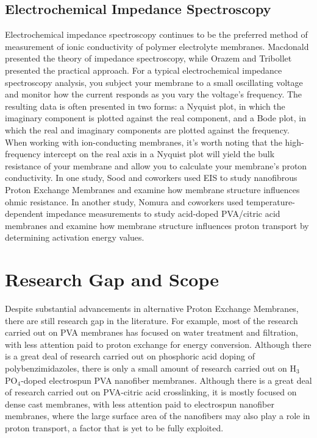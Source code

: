 \documentclass[12pt,a4paper]{report}
\begin{document}
\subsection{Electrochemical Impedance Spectroscopy}
Electrochemical impedance spectroscopy continues to be the preferred method of measurement of ionic conductivity of polymer electrolyte membranes. Macdonald presented the theory of impedance spectroscopy,\cite{65} while Orazem and Tribollet presented the practical approach.\cite{66,67}
For a typical electrochemical impedance spectroscopy analysis, you subject your membrane to a small oscillating voltage and monitor how the current responds as you vary the voltage’s frequency. The resulting data is often presented in two forms: a Nyquist plot, in which the imaginary component is plotted against the real component, and a Bode plot, in which the real and imaginary components are plotted against the frequency. When working with ion-conducting membranes, it’s worth noting that the high-frequency intercept on the real axis in a Nyquist plot will yield the bulk resistance of your membrane and allow you to calculate your membrane’s proton conductivity. In one study, Sood and coworkers used EIS to study nanofibrous Proton Exchange Membranes and examine how membrane structure influences ohmic resistance.\cite{52} In another study, Nomura and coworkers used temperature-dependent impedance measurements to study acid-doped PVA/citric acid membranes and examine how membrane structure influences proton transport by determining activation energy values.\cite{60}

\section{Research Gap and Scope}
Despite substantial advancements in alternative Proton Exchange Membranes, there are still research gap in the literature. For example, most of the research carried out on PVA membranes has focused on water treatment and filtration, with less attention paid to proton exchange for energy conversion.\cite{11} Although there is a great deal of research carried out on phosphoric acid doping of polybenzimidazoles,\cite{20,59} there is only a small amount of research carried out on H\(_3\)PO\(_4\)-doped electrospun PVA nanofiber membranes. Although there is a great deal of research carried out on PVA-citric acid crosslinking, it is mostly focused on dense cast membranes, with less attention paid to electrospun nanofiber membranes,\cite{53,54,68} where the large surface area of the nanofibers may also play a role in proton transport, a factor that is yet to be fully exploited.
\end{document}
